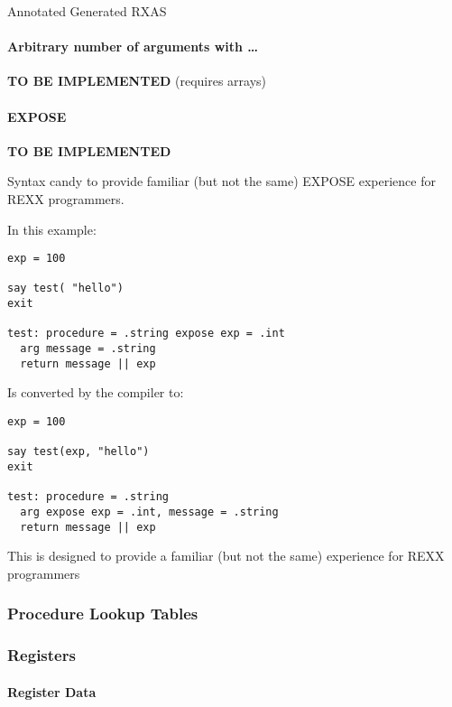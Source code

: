 Annotated Generated RXAS

\hypertarget{arbitrary-number-of-arguments-with}{%
\paragraph{Arbitrary number of arguments with
\ldots{}}\label{arbitrary-number-of-arguments-with}}

\textbf{TO BE IMPLEMENTED} (requires arrays)

\hypertarget{expose}{%
\paragraph{EXPOSE}\label{expose}}

\textbf{TO BE IMPLEMENTED}

Syntax candy to provide familiar (but not the same) EXPOSE experience
for REXX programmers.

In this example:

\begin{verbatim}
exp = 100

say test( "hello")
exit

test: procedure = .string expose exp = .int
  arg message = .string
  return message || exp
\end{verbatim}

Is converted by the compiler to:

\begin{verbatim}
exp = 100

say test(exp, "hello")
exit

test: procedure = .string 
  arg expose exp = .int, message = .string
  return message || exp
\end{verbatim}

This is designed to provide a familiar (but not the same) experience for
REXX programmers

\hypertarget{procedure-lookup-tables}{%
\subsubsection{Procedure Lookup Tables}\label{procedure-lookup-tables}}

\hypertarget{registers}{%
\subsubsection{Registers}\label{registers}}

\hypertarget{register-data}{%
\paragraph{Register Data}\label{register-data}}

